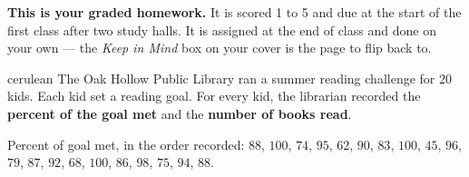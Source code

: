\documentclass[12pt]{article}
\begin{document}

\vspace{0.12in}

\begin{remindbox}
\small
\textbf{This is your graded homework.} It is scored 1 to 5 and due at the
start of the first class after two study halls. It is assigned at the end of class and done on
your own --- the \emph{Keep in Mind} box on your cover is the page to flip back to.
\end{remindbox}

\vspace{0.08in}

\boxguard[20]
\begin{scenariobox}{cerulean}
The Oak Hollow Public Library ran a summer reading challenge for $20$ kids. Each kid set a
reading goal. For every kid, the librarian recorded the \textbf{percent of the goal met} and the
\textbf{number of books read}.

\vspace{2pt}
Percent of goal met, in the order recorded: $88$, $100$, $74$, $95$, $62$, $90$, $83$, $100$,
$45$, $96$, $79$, $87$, $92$, $68$, $100$, $86$, $98$, $75$, $94$, $88$.
\end{scenariobox}

\vspace{0.08in}
\end{document}
